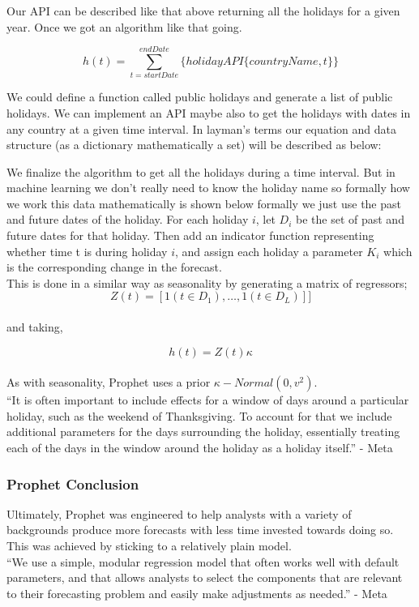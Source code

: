 Our API can be described like that above returning all the holidays for a given year. Once we got an algorithm like that going.

\begin{equation} 
    h(t) = \sum_{t=startDate}^{endDate} \{ holidayAPI\{countryName,t\} \} 
\end{equation}

We could define a function called public holidays and generate a list of public holidays. We can implement an API maybe also to get the holidays with dates in any country at a given time interval. In layman’s terms our equation and data structure (as a dictionary mathematically a set) will be described as below:

We finalize the algorithm to get all the holidays during a time interval. But in machine learning we don’t really need to know the holiday name so formally how we work this data mathematically is shown below formally we just use the past and future dates of the holiday.
For each holiday $i$, let $D_i$ be the set of past and future dates for that holiday. Then add an indicator function representing whether time t is during holiday $i$, and assign each holiday a parameter $K_i$ which is the corresponding change in the forecast.\\

This is done in a similar way as seasonality by generating a matrix of regressors; \\
\begin{equation}
    Z(t)= [1(t \in D_1),…,1(t \in D_L)]] 
\end{equation} \\

and taking,

\begin{equation}
    h(t) = Z(t)\kappa 
\end{equation} \\

As with seasonality, Prophet uses a prior $\kappa-Normal(0,v^2)$. \\ 

“It is often important to include effects for a window of days around a particular holiday, such as the weekend of Thanksgiving. To account for that we include additional parameters for the days surrounding the holiday, essentially treating each of the days in the window around the holiday as a holiday itself.” - Meta

\subsubsection{Prophet Conclusion}
Ultimately, Prophet was engineered to help analysts with a variety of backgrounds produce more forecasts with less time invested towards doing so. This was achieved by sticking to a relatively plain model. \\ 
“We use a simple, modular regression model that often works well with default parameters, and that allows analysts to select the components that are relevant to their forecasting problem and easily make adjustments as needed.” - Meta

